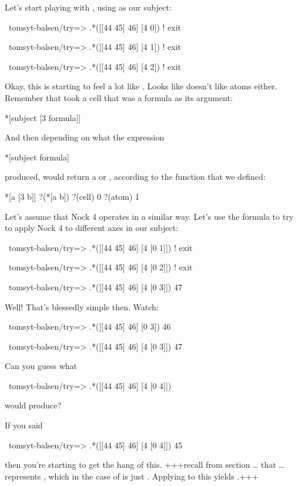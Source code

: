 Let's start playing with , using \kode{[[44 45] 46]} as our subject:
\begin{code}
~tomsyt-balsen/try=> .*([[44 45] 46] [4 0])
! exit

~tomsyt-balsen/try=> .*([[44 45] 46] [4 1])
! exit

~tomsyt-balsen/try=> .*([[44 45] 46] [4 2])
! exit
\end{code}
Okay, this is starting to feel a lot like . Looks like  doesn't
like atoms either. Remember that  took a cell that was a formula as its
argument:
\begin{code}
*[subject [3 formula]]
\end{code}
And then depending on what the expression
\begin{code}
*[subject formula]
\end{code}
produced,  would return a  or , according to the function 
that we defined:
\begin{code}
*[a [3 b]]         ?(*[a b])
?(cell)            0
?(atom)            1
\end{code}
Let's assume that Nock 4 operates in a similar way. Let's use the formula \kode{[0
n]} to try to apply Nock 4 to different axes in our subject:

\begin{code}
~tomsyt-balsen/try=> .*([[44 45] 46] [4 [0 1]])
! exit

~tomsyt-balsen/try=> .*([[44 45] 46] [4 [0 2]])
! exit

~tomsyt-balsen/try=> .*([[44 45] 46] [4 [0 3]])
47
\end{code}
Well! That's blessedly simple then. Watch:
\begin{code}
~tomsyt-balsen/try=> .*([[44 45] 46] [0 3])
46

~tomsyt-balsen/try=> .*([[44 45] 46] [4 [0 3]])
47
\end{code}
Can you guess what
\begin{code}
~tomsyt-balsen/try=> .*([[44 45] 46] [4 [0 4]])
\end{code}
would produce?

If you said
\begin{code}
~tomsyt-balsen/try=> .*([[44 45] 46] [4 [0 4]])
45
\end{code}
then you're starting to get the hang of this. +++recall from section \ldots{} that \ldots{} represents , which in the case of \kode{[[44 45] 46]} is just . Applying  to this yields .+++

